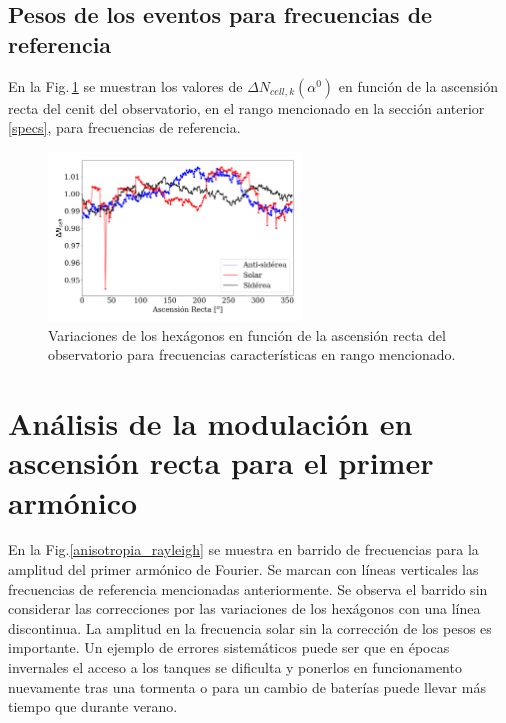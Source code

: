 \subsection{Pesos de los eventos para frecuencias de referencia}

En la Fig.\,\ref{pesos_bin_1_2} se muestran los valores de  $\Delta N_{cell,k}(\alpha^0)$ en función de la ascensión recta del cenit del observatorio, en el rango mencionado en la sección anterior \ref{specs}, para frecuencias de referencia. 
			 
			\begin{figure}[H]
				\centering
				\includegraphics[width=0.6\textwidth]{weights_2013_2020.png}
				\caption{Variaciones de los hexágonos en función de la ascensión recta del observatorio para frecuencias características en rango mencionado. }
				\label{pesos_bin_1_2}
			\end{figure}


\section{Análisis de la modulación en ascensión recta para el primer armónico}

En la Fig.\ref{anisotropia_rayleigh} se muestra en barrido de frecuencias para la amplitud del primer armónico de Fourier. Se marcan con líneas verticales las frecuencias de referencia mencionadas anteriormente. Se observa el barrido sin considerar las correcciones por las variaciones de los hexágonos con una línea discontinua. La  amplitud  en la frecuencia solar sin la corrección de los pesos es importante. Un ejemplo de errores sistemáticos puede ser que en épocas invernales el acceso a los tanques se dificulta y ponerlos en funcionamento nuevamente tras una tormenta o para un cambio de baterías puede llevar más tiempo que durante verano. 

